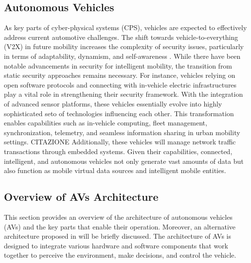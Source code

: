 \subsection{Autonomous Vehicles}\label{subsec:autonomous-vehicles}

As key parts of cyber-physical systems (CPS), vehicles are expected to effectively address current automotive challenges.
The shift towards vehicle-to-everything (V2X) in future mobility increases the complexity of security issues, particularly in terms of adaptability, dynamism, and self-awareness \cite{connected_vehicles_security_2023,bouchouia2023survey} .
While there have been notable advancements in security for intelligent mobility, the transition from static security approaches remains necessary.
For instance, vehicles relying on open software protocols and connecting with in-vehicle electric infrastructures play a vital role in strengthening their security framework.
With the integration of advanced sensor platforms, these vehicles essentially evolve into highly sophisticated seto of technologies influencing each other.
This transformation enables capabilities such as in-vehicle computing, fleet management, synchronization, telemetry, and seamless information sharing in urban mobility settings. CITAZIONE
Additionally, these vehicles will manage network traffic transactions through embedded systems.
Given their capabilities, connected, intelligent, and autonomous vehicles not only generate vast amounts of data but also function as mobile virtual data sources and intelligent mobile entities.


\subsection{Overview of AVs Architecture}\label{subsec:overview-on-avs-architecture}

This section provides an overview of the architecture of autonomous vehicles (AVs) and the key parts that enable their operation.
Moreover, an alternative architecture proposed in \cite{2023survey} will be briefly discussed.
The architecture of AVs is designed to integrate various hardware and software components that work together to perceive the environment, make decisions, and control the vehicle.

\cite{architecture}

